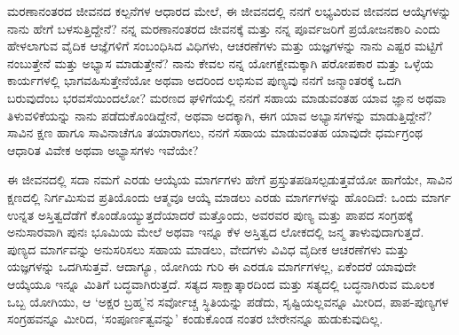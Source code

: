 \newpage
\begin{mananam}{}
\nfntmtxt \footnotesize ಮರಣಾನಂತರದ ಜೀವನದ ಕಲ್ಪನೆಗಳ ಆಧಾರದ ಮೇಲೆ, ಈ ಜೀವನದಲ್ಲಿ ನನಗೆ ಲಭ್ಯವಿರುವ ಜೀವನದ ಆಯ್ಕೆಗಳನ್ನು ನಾನು ಹೇಗೆ ಬಳಸುತ್ತಿದ್ದೇನೆ? ನನ್ನ ಮರಣಾನಂತರದ ಜೀವನಕ್ಕೆ ಮತ್ತು ನನ್ನ ಪೂರ್ವಜರಿಗೆ ಪ್ರಯೋಜನಕಾರಿ ಎಂದು ಹೇಳಲಾಗುವ ವೈದಿಕ ಆಜ್ಞೆಗಳಿಗೆ ಸಂಬಂಧಿಸಿದ ವಿಧಿಗಳು, ಆಚರಣೆಗಳು ಮತ್ತು ಯಜ್ಞಗಳನ್ನು ನಾನು ಎಷ್ಟರ ಮಟ್ಟಿಗೆ ನಂಬುತ್ತೇನೆ ಮತ್ತು ಅಭ್ಯಾಸ ಮಾಡುತ್ತೇನೆ? 
ನಾನು ಕೇವಲ ನನ್ನ ಯೋಗಕ್ಷೇಮಕ್ಕಾಗಿ  ಪರೋಪಕಾರ ಮತ್ತು ಒಳ್ಳೆಯ ಕಾರ್ಯಗಳಲ್ಲಿ ಭಾಗವಹಿಸುತ್ತೇನೆಯೋ ಅಥವಾ ಅದರಿಂದ ಲಭಿಸುವ ಪುಣ್ಯವು ನನಗೆ ಜನ್ಮಾಂತರಕ್ಕೆ ಒದಗಿ ಬರುವುದೆಂಬ ಭರವಸೆಯಿಂದಲೋ? ಮರಣದ ಘಳಿಗೆಯಲ್ಲಿ ನನಗೆ ಸಹಾಯ ಮಾಡುವಂತಹ ಯಾವ ಜ್ಞಾನ ಅಥವಾ ತಿಳುವಳಿಕೆಯನ್ನು ನಾನು ಪಡೆದುಕೊಂಡಿದ್ದೇನೆ, ಅಥವಾ ಅದಕ್ಕಾಗಿ, ಈಗ ಯಾವ ಅಭ್ಯಾಸಗಳನ್ನು ಮಾಡುತ್ತಿದ್ದೇನೆ? ಸಾವಿನ ಕ್ಷಣ ಹಾಗೂ ಸಾವಿನಾಚೆಗೂ ತಯಾರಾಗಲು, ನನಗೆ ಸಹಾಯ ಮಾಡುವಂತಹ ಯಾವುದೇ ಧರ್ಮಗ್ರಂಥ ಆಧಾರಿತ ವಿವೇಕ ಅಥವಾ ಅಭ್ಯಾಸಗಳು ಇವೆಯೇ?
\end{mananam}
\sReflect
\begin{inspiration}{}
\nfntmtxt \footnotesize ಈ ಜೀವನದಲ್ಲಿ ಸದಾ ನಮಗೆ ಎರಡು ಆಯ್ಕೆಯ ಮಾರ್ಗಗಳು ಹೇಗೆ ಪ್ರಸ್ತುತಪಡಿಸಲ್ಪಡುತ್ತವೆಯೋ  ಹಾಗೆಯೇ, ಸಾವಿನ ಕ್ಷಣದಲ್ಲಿ ನಿರ್ಗಮಿಸುವ ಪ್ರತಿಯೊಂದು ಆತ್ಮವೂ ಆಯ್ಕೆ ಮಾಡಲು ಎರಡು ಮಾರ್ಗಗಳನ್ನು ಹೊಂದಿದೆ: ಒಂದು  ಮಾರ್ಗ ಉನ್ನತ ಅಸ್ತಿತ್ವದೆಡೆಗೆ ಕೊಂಡೊಯ್ಯುತ್ತದೆಯಾದರೆ  ಮತ್ತೊಂದು,  ಅವರವರ ಪುಣ್ಯ ಮತ್ತು ಪಾಪದ ಸಂಗ್ರಹಕ್ಕೆ ಅನುಸಾರವಾಗಿ ಪುನಃ ಭೂಮಿಯ ಮೇಲೆ ಅಥವಾ ಇನ್ನೂ ಕೆಳ ಅಸ್ತಿತ್ವದ ಲೋಕದಲ್ಲಿ ಜನ್ಮ ತಾಳುವುದಾಗುತ್ತದೆ. ಪುಣ್ಯದ ಮಾರ್ಗವನ್ನು ಅನುಸರಿಸಲು ಸಹಾಯ ಮಾಡಲು, ವೇದಗಳು ವಿವಿಧ ವೈದೀಕ ಆಚರಣೆಗಳು ಮತ್ತು ಯಜ್ಞಗಳನ್ನು ಒದಗಿಸುತ್ತವೆ. ಆದಾಗ್ಯೂ, ಯೋಗಿಯ ಗುರಿ ಈ ಎರಡೂ ಮಾರ್ಗಗಳಲ್ಲ, ಏಕೆಂದರೆ ಯಾವುದೇ ಆಯ್ಕೆಯೂ ಇನ್ನೂ ಮಿತಿಗೆ ಬದ್ಧವಾಗಿರುತ್ತದೆ. 
ಸತ್ಯದ ಸಾಕ್ಷಾತ್ಕಾರದಿಂದ ಮತ್ತು ಸತ್ಯದಲ್ಲಿ ಬದ್ಧನಾಗಿರುವ ಮೂಲಕ ಒಬ್ಬ ಯೋಗಿಯು, ಆ ‘ಅಕ್ಷರ ಬ್ರಹ್ಮ’ನ ಸರ್ವೋಚ್ಚ ಸ್ಥಿತಿಯನ್ನು ಪಡೆದು, ಸೃಷ್ಟಿಯಲ್ಲವನ್ನೂ ಮೀರಿದ, ಪಾಪ-ಪುಣ್ಯಗಳ ಸಂಗ್ರಹವನ್ನೂ ಮೀರಿದ, ‘ಸಂಪೂರ್ಣತ್ವವನ್ನು’ ಕಂಡುಕೊಂಡ ನಂತರ ಬೇರೇನನ್ನೂ ಹುಡುಕುವುದಿಲ್ಲ.
\end{inspiration}
\newpage


